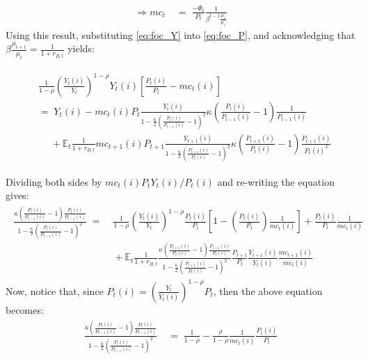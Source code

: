 \documentclass[a4paper, 12pt]{article}
\begin{document}
\begin{Answer}
\begin{align*}
		\Rightarrow mc_t \; & = \; \frac{-\Phi_t}{P_t} \frac{1}{\beta^{t-1}\frac{\mu_t}{\mu_1}}%
	\end{align*}
	Using this result, substituting \eqref{eq:foc_Y} into \eqref{eq:foc_P}, and acknowledging that $\beta \frac{\mu_{t+1}}{\mu_t} = \frac{1}{1+r_{B,t}}$ yields:
	\begin{small}%
	\begin{align*}%
		\begin{split}%
			& \frac{1}{1-\rho}\left( \frac{Y_t(i)}{Y_t} \right)^{1-\rho} Y_t(i) \left[ \frac{P_t(i)}{P_t} - mc_t(i) \right]\\
			& = \; Y_t(i) - mc_t(i) P_t \frac{Y_t(i)}{1-\frac{\kappa}{2}\left(\frac{P_t(i)}{P_{t-1}(i)}-1\right)^2} \kappa \left( \frac{P_t(i)}{P_{t-1}(i)} - 1 \right)\frac{1}{P_{t-1}(i)}\\
			& \; \quad + \mathbb{E}_t \frac{1}{1+r_{B,t}} mc_{t+1}(i) P_{t+1} \frac{Y_{t+1}(i)}{1-\frac{\kappa}{2}\left(\frac{P_{t+1}(i)}{P_{t}(i)}-1\right)^2} \kappa \left( \frac{P_{t+1}(i)}{P_{t}(i)} - 1 \right)\frac{P_{t+1}(i)}{P_t(i)^2}
		\end{split}%
	\end{align*}%
	\end{small}%
	Dividing both sides by $mc_t(i)P_tY_t(i) / P_t(i)$ and re-writing the equation gives:%
	\begin{align*}%
		\begin{split}%
			\frac{\kappa \left( \frac{P_t(i)}{P_{t-1}(i)} - 1\right) \frac{P_t(i)}{P_{t-1}(i)}}{1-\frac{\kappa}{2}\left(\frac{P_t(i)}{P_{t-1}(i)}-1\right)^2} \; = & \; \frac{1}{1-\rho}\left( \frac{Y_t(i)}{Y_t} \right)^{1-\rho} \frac{P_t(i)}{P_t} \left[ 1 - \left( \frac{P_t(i)}{P_t} \right) \frac{1}{mc_t(i)} \right] + \frac{P_t(i)}{P_t} \frac{1}{mc_t(i)}\\%
			& \; + \mathbb{E}_t \frac{1}{1+r_{B,t}} \frac{\kappa\left( \frac{P_{t+1}(i)}{P_{t}(i)} - 1 \right) \frac{P_{t+1}(i)}{P_t(i)}}{1-\frac{\kappa}{2}\left(\frac{P_{t+1}(i)}{P_{t}(i)}-1\right)^2} \frac{P_{t+1}}{P_t} \frac{Y_{t+1}(i)}{Y_t(i)} \frac{mc_{t+1}(i)}{mc_t(i)}%
		\end{split}%
	\end{align*}%
	Now, notice that, since $P_t(i) = \left( \frac{Y_t}{Y_t(i)} \right)^{1-\rho}P_t$, then the above equation becomes:%
	\begin{align*}%
		\begin{split}%
			\frac{\kappa \left( \frac{P_t(i)}{P_{t-1}(i)} - 1\right) \frac{P_t(i)}{P_{t-1}(i)}}{1-\frac{\kappa}{2}\left(\frac{P_t(i)}{P_{t-1}(i)}-1\right)^2} \; & = \; \frac{1}{1-\rho} - \frac{\rho}{1-\rho} \frac{1}{mc_t(i)} \frac{P_t(i)}{P_t} \\%

\end{split}
\end{align*}
\end{Answer}
\end{document}

